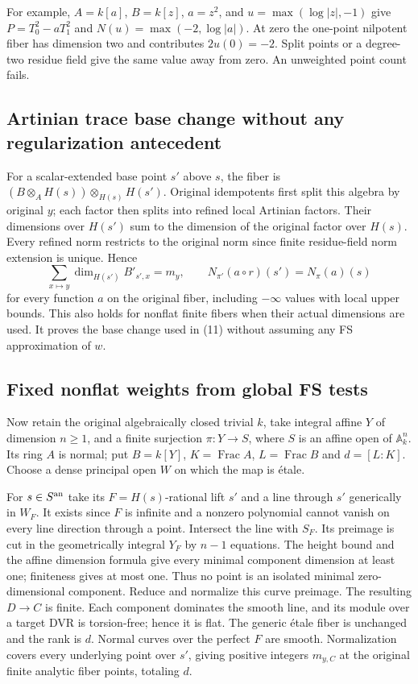 \documentclass[
  11pt,
]{article}
\begin{document}
For example, \(A=k[a]\), \(B=k[z]\), \(a=z^2\), and
\(u=\max(\log|z|,-1)\) give \(P=T_0^2-aT_1^2\) and
\(N(u)=\max(-2,\log|a|)\). At zero the one-point nilpotent fiber has
dimension two and contributes \(2u(0)=-2\). Split points or a degree-two
residue field give the same value away from zero. An unweighted point
count fails.

\subsection{Artinian trace base change without any regularization
antecedent}\label{artinian-trace-base-change-without-any-regularization-antecedent}

For a scalar-extended base point \(s'\) above \(s\), the fiber is
\((B\otimes_A H(s))\otimes_{H(s)}H(s')\). Original idempotents first
split this algebra by original \(y\); each factor then splits into
refined local Artinian factors. Their dimensions over \(H(s')\) sum to
the dimension of the original factor over \(H(s)\). Every refined norm
restricts to the original norm since finite residue-field norm extension
is unique. Hence \[\sum_{x\mapsto y}\dim_{H(s')}B'_{s',x}=m_y,\qquad
 N_{\pi'}(a\circ r)(s')=N_\pi(a)(s)                                    \tag{14}\]
for every function \(a\) on the original fiber, including \(-\infty\)
values with local upper bounds. This also holds for nonflat finite
fibers when their actual dimensions are used. It proves the base change
used in (11) without assuming any FS approximation of \(w\).

\subsection{Fixed nonflat weights from global FS
tests}\label{fixed-nonflat-weights-from-global-fs-tests}

Now retain the original algebraically closed trivial \(k\), take
integral affine \(Y\) of dimension \(n\ge1\), and a finite surjection
\(\pi:Y\to S\), where \(S\) is an affine open of \(\mathbb A_k^n\). Its
ring \(A\) is normal; put \(B=k[Y]\), \(K=\operatorname{Frac}A\),
\(L=\operatorname{Frac}B\) and \(d=[L:K]\). Choose a dense principal
open \(W\) on which the map is étale.

For \(s\in S^{\rm an}\) take its \(F=H(s)\)-rational lift \(s'\) and a
line through \(s'\) generically in \(W_F\). It exists since \(F\) is
infinite and a nonzero polynomial cannot vanish on every line direction
through a point. Intersect the line with \(S_F\). Its preimage is cut in
the geometrically integral \(Y_F\) by \(n-1\) equations. The height
bound and the affine dimension formula give every minimal component
dimension at least one; finiteness gives at most one. Thus no point is
an isolated minimal zero-dimensional component. Reduce and normalize
this curve preimage. The resulting \(D\to C\) is finite. Each component
dominates the smooth line, and its module over a target DVR is
torsion-free; hence it is flat. The generic étale fiber is unchanged and
the rank is \(d\). Normal curves over the perfect \(F\) are smooth.
Normalization covers every underlying point over \(s'\), giving positive
integers \(m_{y,C}\) at the original finite analytic fiber points,
totaling \(d\).
\end{document}
